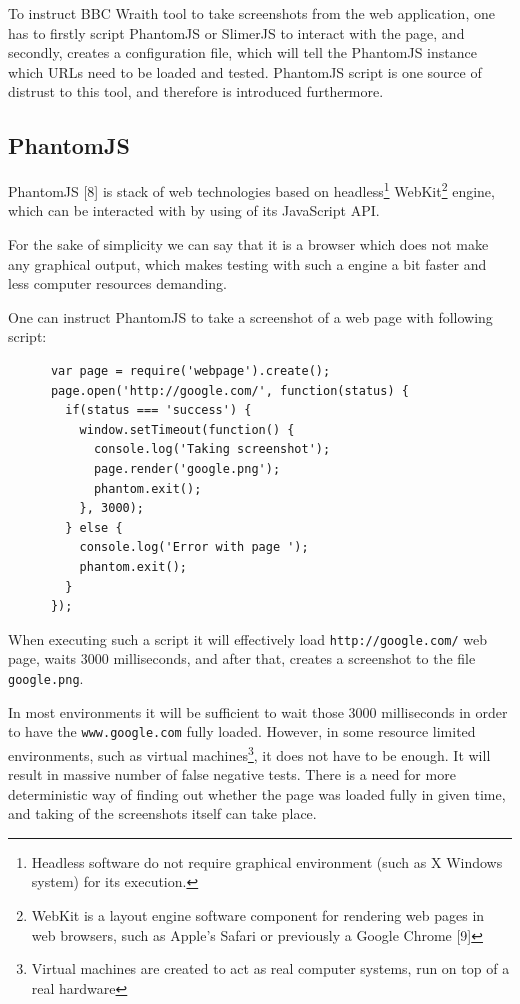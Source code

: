\documentclass[11pt,oneside,final]{fithesis2}
\begin{document}
  To instruct BBC Wraith tool to take screenshots from the web application, one has to firstly script PhantomJS or SlimerJS to interact with the page, and secondly, creates a 
  configuration file, which will tell the PhantomJS instance which URLs need to be loaded and tested. PhantomJS script is one source of distrust to this tool, and therefore is
  introduced furthermore.
  
    \subsection{PhantomJS}
    \label{subsec:phantomJS}
    PhantomJS [8] is stack of web technologies based on headless\footnote{Headless software do not require graphical environment (such as X Windows system) for its execution.} 
    WebKit\footnote{WebKit is a layout engine software component for rendering web pages in web browsers, such as Apple's Safari or previously a Google Chrome [9]} engine, which can be 
    interacted with by using of its JavaScript API.
    
    For the sake of simplicity we can say that it is a browser which does not make any graphical output, which makes testing with such a engine a bit faster and less computer resources 
    demanding.
    
    One can instruct PhantomJS to take a screenshot of a web page with following script:
  
    \begin{verbatim}
      var page = require('webpage').create();
      page.open('http://google.com/', function(status) {
        if(status === 'success') {
          window.setTimeout(function() {
            console.log('Taking screenshot');
            page.render('google.png');
            phantom.exit();
          }, 3000);
        } else {
          console.log('Error with page ');
          phantom.exit();
        }
      });
    \end{verbatim}
    
    When executing such a script it will effectively load \texttt{http://google.com/} web page, waits 3000 milliseconds, and after that, creates a screenshot to the file \texttt{google.png}.
    
    In most environments it will be sufficient to wait those 3000 milliseconds in order to have the \texttt{www.google.com} fully loaded. However, in some resource limited environments, 
    such as virtual machines\footnote{Virtual machines are created to act as real computer systems, run on top of a real hardware}, it does not have to be enough. 
    It will result in massive number of false negative tests. There is a need for more deterministic way of finding out whether the page was loaded fully in given time, and 
    taking of the screenshots itself can take place.
    
\end{document}

